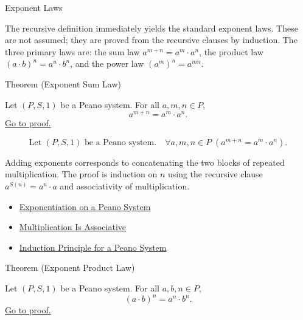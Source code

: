 \begin{topicbox}{Exponent Laws}
\begin{exposition}
The recursive definition immediately yields the standard exponent laws.
These are not assumed; they are proved from the recursive clauses by induction.
The three primary laws are: the sum law $a^{m+n} = a^m \cdot a^n$, the
product law $(a \cdot b)^n = a^n \cdot b^n$, and the power law $(a^m)^n =
a^{mn}$.
\end{exposition}

\begin{theorembox}{Theorem (Exponent Sum Law)}
\begin{theorem}
\label{thm:exponent-sum-law}
Let $(P,S,1)$ be a Peano system. For all $a,m,n \in P$,
\[
a^{m+n} = a^m \cdot a^n.
\]
\hyperref[prf:exponent-sum-law]{Go to proof.}
\end{theorem}
\end{theorembox}

\begin{remark*}
\[
\text{Let } (P,S,1) \text{ be a Peano system.}\quad
\forall a,m,n \in P\;(a^{m+n} = a^m \cdot a^n).
\]
\end{remark*}

\begin{remark*}[Interpretation]
Adding exponents corresponds to concatenating the two blocks of repeated
multiplication. The proof is induction on $n$ using the recursive clause
$a^{S(n)} = a^n \cdot a$ and associativity of multiplication.
\end{remark*}

\begin{dependencies}
\begin{itemize}
  \item \hyperref[def:exponentiation-on-peano-system]{Exponentiation on a Peano System}
  \item \hyperref[thm:multiplication-associative]{Multiplication Is Associative}
  \item \hyperref[thm:induction-principle-for-peano-system]{Induction Principle for a Peano System}
\end{itemize}
\end{dependencies}

\begin{theorembox}{Theorem (Exponent Product Law)}
\begin{theorem}
\label{thm:exponent-product-law}
Let $(P,S,1)$ be a Peano system. For all $a,b,n \in P$,
\[
(a \cdot b)^n = a^n \cdot b^n.
\]
\hyperref[prf:exponent-product-law]{Go to proof.}
\end{theorem}
\end{theorembox}


\end{topicbox}
